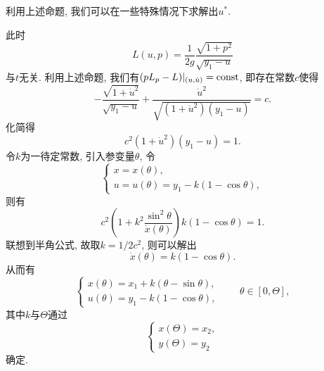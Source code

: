 利用上述命题, 我们可以在一些特殊情况下求解出$u^*$.

\begin{example}[最速降线-续]
    此时
    \begin{equation*}
        L(u, p) = \frac{1}{2g}\frac{\sqrt{1 + p^2}}{\sqrt{y_1 - u}}
    \end{equation*}
    与$t$无关. 利用上述命题, 我们有$(pL_p - L)|_{(u, \dot{u})} = {\rm const}$, 即存在常数$c$使得 
    \begin{equation*}
        -\frac{\sqrt{1 + \dot{u}^2}}{\sqrt{y_1 - u}} + \frac{\dot{u}^2}{\sqrt{(1 + \dot{u}^2)(y_1 - u)}} = c.
    \end{equation*}
    化简得 
    \begin{equation*}
        c^2(1 + \dot{u}^2)(y_1 - u) = 1.
    \end{equation*}
    令$k$为一待定常数, 引入参变量$\theta$, 令 
    \begin{equation*}
        \begin{cases} 
            x = x(\theta), \\  
            u = u(\theta) = y_1 - k(1 - \cos\theta), \end{cases}
    \end{equation*}
    则有 
    \begin{equation*}
        c^2\left(1 + k^2\frac{\sin^2\theta}{\dot{x}(\theta)}\right)k(1 - \cos\theta) = 1.
    \end{equation*}
    联想到半角公式, 故取$k = 1/2c^2$, 则可以解出 
    \begin{equation*}
        \dot{x}(\theta) = k(1 - \cos\theta).
    \end{equation*} 
    从而有
    \begin{equation*}
        \begin{cases} 
            x(\theta) = x_1 + k(\theta - \sin\theta), \\ 
            u(\theta) = y_1 - k(1 - \cos\theta), 
        \end{cases} \qquad \theta \in [0, \Theta],
    \end{equation*}
    其中$k$与$\Theta$通过
    \begin{equation*}
        \begin{cases} 
            x(\Theta) = x_2, \\  
            y(\Theta) = y_2 
        \end{cases}
    \end{equation*}
    确定.
\end{example}
